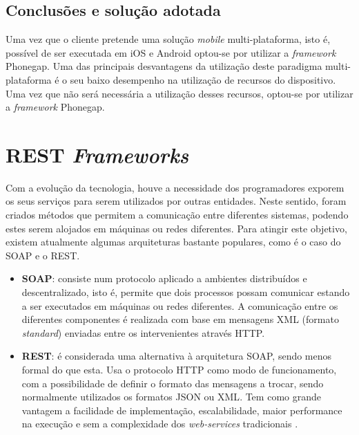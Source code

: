 \subsection{Conclusões e solução adotada}

Uma vez que o cliente pretende uma solução \textit{mobile} multi-plataforma, isto é, possível de ser executada em iOS e Android optou-se por utilizar a \textit{framework} Phonegap.  Uma das principais desvantagens da utilização deste paradigma multi-plataforma é o seu baixo desempenho na utilização de recursos do dispositivo. Uma vez que não será necessária a utilização desses recursos, optou-se por utilizar a \textit{framework} Phonegap. 

\section{REST \textit{Frameworks}}

Com a evolução da tecnologia, houve a necessidade dos programadores exporem os seus serviços para serem utilizados por outras entidades. Neste sentido, foram criados métodos que permitem a comunicação  entre diferentes sistemas, podendo estes serem alojados em máquinas ou redes diferentes. Para atingir este objetivo, existem atualmente algumas arquiteturas bastante populares, como é o caso do \ac{SOAP} e o \ac{REST}. 

\begin{itemize}
	\item \textbf{\ac{SOAP}}: consiste num protocolo aplicado a ambientes distribuídos e descentralizado, isto é, permite que dois processos possam comunicar estando a ser executados em máquinas ou redes diferentes\cite{Kang2015}. A comunicação entre os diferentes componentes é realizada com base em mensagens \ac{XML} (formato \textit{standard}) enviadas entre os intervenientes através \ac{HTTP}.
	
	
	\item \textbf{\ac{REST}}: é considerada uma alternativa à arquitetura \ac{SOAP}, sendo menos formal do que esta. Usa o protocolo \ac{HTTP} como modo de funcionamento, com a possibilidade de definir o formato das mensagens a trocar, sendo normalmente utilizados os formatos \ac{JSON} ou \ac{XML}. Tem como grande vantagem a facilidade de implementação, escalabilidade, maior performance na execução e sem a complexidade dos \textit{web-services} tradicionais \cite{restpaper}. 
	
\end{itemize}

